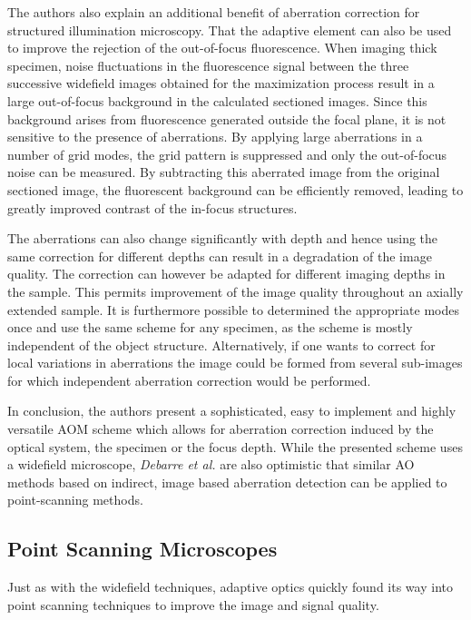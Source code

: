 The authors also explain an additional benefit of aberration correction for structured illumination microscopy. That the adaptive element can also be used to improve the rejection of the out-of-focus fluorescence. When imaging thick specimen, noise fluctuations in the fluorescence signal between the three successive widefield images obtained for the maximization process result in a large out-of-focus background in the calculated sectioned images. Since this background arises from fluorescence generated outside the focal plane, it is not  sensitive to the presence of aberrations. By applying large aberrations in a number of grid modes, the grid pattern is suppressed and only the out-of-focus noise can be measured. By subtracting this aberrated image from the original sectioned image, the fluorescent background can be efficiently removed, leading to greatly improved contrast of the in-focus structures.

The aberrations can also change significantly with depth and hence using the same correction for different depths can result in a degradation of the image quality.  The correction can however be adapted for different imaging depths in the sample. This permits improvement of the image quality throughout an axially extended sample.
It is furthermore possible to determined the appropriate modes once and use the same scheme for any specimen, as the scheme is mostly independent of the object structure. Alternatively, if one wants to correct for local variations in aberrations the image could be formed from several sub-images for which independent aberration correction would be performed.

In conclusion, the authors present a sophisticated, easy to implement and highly versatile AOM scheme which allows for aberration correction induced by the optical system, the specimen or the focus depth. While the presented scheme uses a widefield microscope, \emph{Debarre et al.} are also optimistic that similar AO methods based on indirect, image based aberration detection can be applied to point-scanning methods. 


\subsection{Point Scanning Microscopes}
\label{sec:PointScanningMicroscopes}

Just as with the widefield techniques, adaptive optics quickly found its way into point scanning techniques to improve the image and signal quality. 

